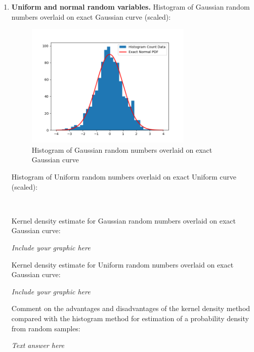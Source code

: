 \documentclass[12pt]{article}
\begin{document}
\begin{enumerate}
\item {\bf Uniform and normal random variables.}
Histogram of Gaussian random numbers overlaid on exact Gaussian curve (scaled):

\begin{figure}[h]
    \centering
    \includegraphics[width=0.75\textwidth]{q1_1}
    \caption{Histogram of Gaussian random numbers overlaid on exact Gaussian curve}
    \label{fig:q1_1}
\end{figure}

\vspace{3in}

Histogram of Uniform random numbers overlaid on exact Uniform curve (scaled):

\
\vspace{3in}

\vspace{3in}



Kernel density estimate for Gaussian random numbers overlaid on exact Gaussian curve:


{\em Include your graphic here}
\vspace{3in}



Kernel density estimate for Uniform random numbers overlaid on exact Gaussian curve:


{\em Include your graphic here}
\vspace{3in}

Comment on the advantages and disadvantages of the kernel density method compared with the histogram method for estimation of a probability density from random samples:


{\em Text answer  here}
\vspace{3in}




\end{enumerate}
\end{document}

